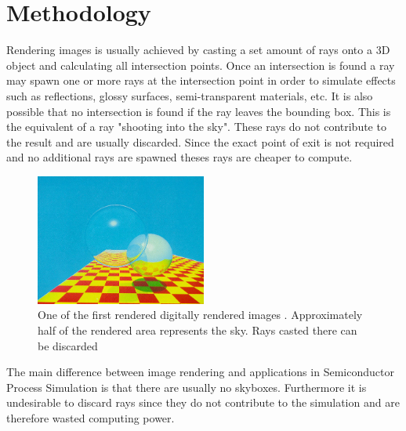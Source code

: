 \section{Methodology}

Rendering images is usually achieved by casting a set amount of rays onto a 3D object and calculating all intersection points.
Once an intersection is found a ray may spawn one or more rays at the intersection point in order to simulate effects such as reflections, glossy surfaces, semi-transparent materials, etc.
It is also possible that no intersection is found if the ray leaves the bounding box. This is the equivalent of a ray "shooting into the sky".
These rays do not contribute to the result and are usually discarded. 
Since the exact point of exit is not required and no additional rays are spawned theses rays are cheaper to compute.


\begin{figure}[H]
	\centering
	\includegraphics[width=0.5\textwidth]{res/rendered_image_turner.jpg}
	\caption{One of the first rendered digitally rendered images \cite{rendering_turner}. Approximately half of the rendered area represents the sky. Rays casted there can be discarded}
	\label{fig::rendered_image_turner}
\end{figure}


The main difference between image rendering and applications in Semiconductor Process Simulation is that there are usually no skyboxes.
Furthermore it is undesirable to discard rays since they do not contribute to the simulation and are therefore wasted computing power.


